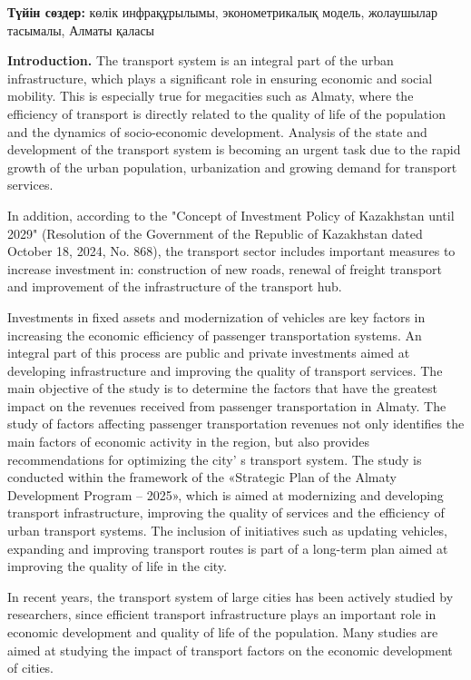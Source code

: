 {\bfseries Түйін сөздер:} көлік инфрақұрылымы, эконометрикалық модель,
жолаушылар тасымалы, Алматы қаласы

\begin{multicols}{2}
{\bfseries Introduction.} The transport system is an integral part of the
urban infrastructure, which plays a significant role in ensuring
economic and social mobility. This is especially true for megacities
such as Almaty, where the efficiency of transport is directly related to
the quality of life of the population and the dynamics of socio-economic
development. Analysis of the state and development of the transport
system is becoming an urgent task due to the rapid growth of the urban
population, urbanization and growing demand for transport services.

In addition, according to the "Concept of Investment Policy of
Kazakhstan until 2029" (Resolution of the Government of the Republic of
Kazakhstan dated October 18, 2024, No. 868), the transport sector
includes important measures to increase investment in: construction of
new roads, renewal of freight transport and improvement of the
infrastructure of the transport hub.

Investments in fixed assets and modernization of vehicles are key
factors in increasing the economic efficiency of passenger
transportation systems. An integral part of this process are public and
private investments aimed at developing infrastructure and improving the
quality of transport services. The main objective of the study is to
determine the factors that have the greatest impact on the revenues
received from passenger transportation in Almaty. The study of factors
affecting passenger transportation revenues not only identifies the main
factors of economic activity in the region, but also provides
recommendations for optimizing the city' s transport
system. The study is conducted within the framework of the «Strategic
Plan of the Almaty Development Program -- 2025», which is aimed at
modernizing and developing transport infrastructure, improving the
quality of services and the efficiency of urban transport systems. The
inclusion of initiatives such as updating vehicles, expanding and
improving transport routes is part of a long-term plan aimed at
improving the quality of life in the city.

In recent years, the transport system of large cities has been actively
studied by researchers, since efficient transport infrastructure plays
an important role in economic development and quality of life of the
population. Many studies are aimed at studying the impact of transport
factors on the economic development of cities.


\end{multicols}
